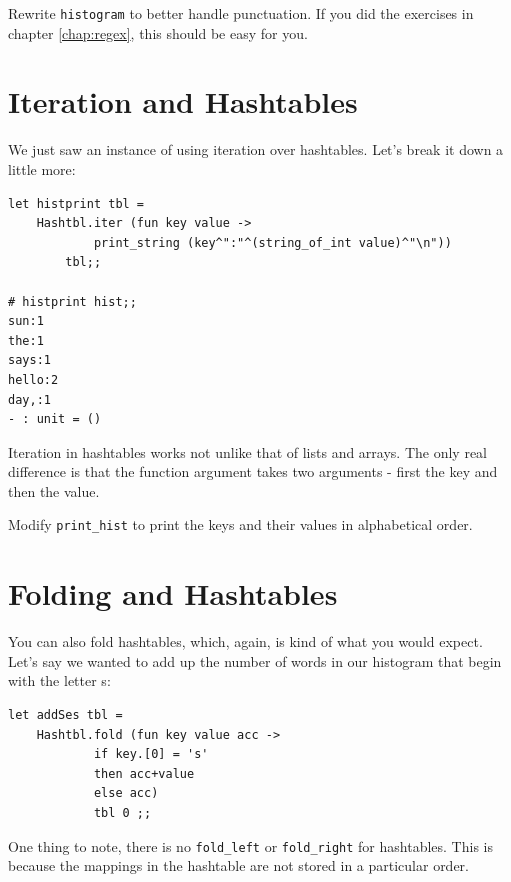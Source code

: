 \documentclass[10pt]{book}
\begin{document}
\begin{ex}
Rewrite {\tt histogram} to better handle punctuation. If you did the exercises in chapter \ref{chap:regex}, this should be easy for you.
\end{ex}

\section{Iteration and Hashtables}


We just saw an instance of using iteration over hashtables. Let's break it down a little more:

\beforeverb
\begin{verbatim}
let histprint tbl = 
	Hashtbl.iter (fun key value ->
			print_string (key^":"^(string_of_int value)^"\n"))
		tbl;;

# histprint hist;;
sun:1
the:1
says:1
hello:2
day,:1
- : unit = ()
\end{verbatim}
\afterverb

Iteration in hashtables works not unlike that of lists and arrays.
The only real difference is that the function argument takes two 
arguments - first the key and then the value.

\begin{ex}

Modify \verb"print_hist" to print the keys and their values
in alphabetical order.

\end{ex}

\section{Folding and Hashtables}

You can also fold hashtables, which, again, is kind of what you
would expect. Let's say we wanted to add up the number of words 
in our histogram that begin with the letter s:

\beforeverb
\begin{verbatim}
let addSes tbl = 
	Hashtbl.fold (fun key value acc -> 
			if key.[0] = 's'
			then acc+value
			else acc)
			tbl 0 ;;
\end{verbatim}
\afterverb

One thing to note, there is no {\tt \verb"fold_left"} or {\tt \verb"fold_right"}
for hashtables. This is because the mappings in the hashtable are not stored in 
a particular order.
\end{document}
